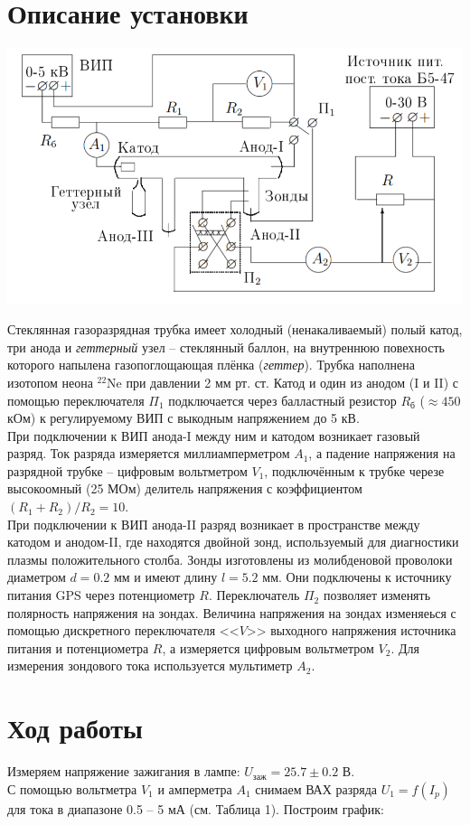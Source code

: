 \documentclass[a4paper,12pt]{article}
\begin{document}
\section*{Описание установки}
\begin{center}
\includegraphics[scale=0.6]{1.png}
\end{center}
Стеклянная газоразрядная трубка имеет холодный (ненакаливаемый) полый катод, три анода и \textit{геттерный} узел -- стеклянный баллон, на внутреннюю повехность которого напылена газопоглощающая плёнка (\textit{геттер}). Трубка наполнена изотопом неона $^22$Ne при давлении 2 мм рт. ст. Катод и один из анодом (I и II) с помощью переключателя $\Pi_1$ подключается через балластный резистор $R_\text{б}$ ($\approx 450$ кОм) к регулируемому ВИП с выкодным напряжением до 5 кВ.\\
При подключении к ВИП анода-I между ним и катодом возникает газовый разряд. Ток разряда измеряется миллиамперметром $A_1$, а падение напряжения на разрядной трубке -- цифровым вольтметром $V_1$, подключённым к трубке черезе высокоомный (25 МОм) делитель напряжения с коэффициентом $(R_1+R_2)/R_2 = 10$.\\
При подключении к ВИП анода-II разряд возникает в пространстве между катодом и анодом-II, где находятся двойной зонд, используемый для диагностики плазмы положительного столба. Зонды изготовлены из молибденовой проволоки диаметром $d = 0.2$ мм и имеют длину $l = 5.2$ мм. Они подключены к источнику питания GPS через потенциометр $R$. Переключатель $\Pi_2$ позволяет изменять полярность напряжения на зондах. Величина напряжения на зондах изменяеься с помощью дискретного переключателя <<$V$>> выходного напряжения источника питания и потенциометра $R$, а измеряется цифровым вольтметром $V_2$. Для измерения зондового тока используется мультиметр $A_2$.
\section*{Ход работы}
Измеряем напряжение зажигания в лампе: $U_{\text{заж}} = 25.7\pm 0.2$ В.\\
С помощью вольтметра $V_1$ и амперметра $A_1$ снимаем ВАХ разряда $U_1=f(I_p)$ для тока в диапазоне 0.5 -- 5 мА (см. Таблица 1).
Построим график:\\
\end{document}
